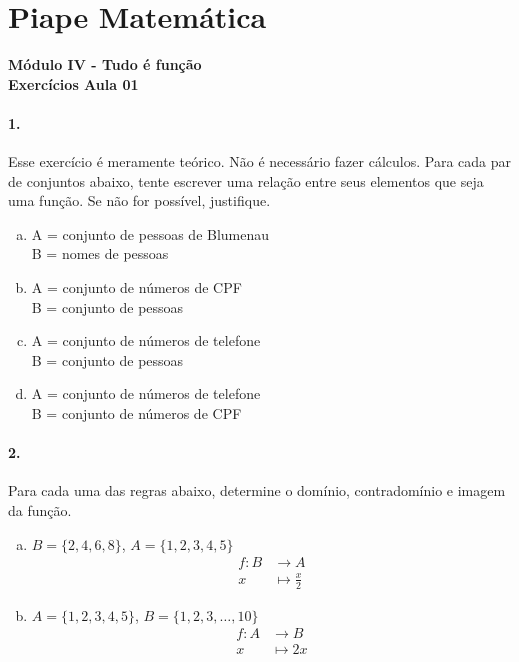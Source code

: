 \documentclass[a4paper,12pt]{article}
\begin{document}
 
  
\section*{Piape Matemática} 
\textbf{Módulo IV - Tudo é função}\\
\textbf{Exercícios Aula 01}         
\begin{multicols}{2}
\paragraph*{1.}  Esse exercício é meramente teórico. Não é necessário fazer cálculos. Para cada par de conjuntos abaixo, tente escrever uma relação entre seus elementos que seja uma função. Se não for possível, justifique.

\begin{enumerate}[a)]
    \item A = conjunto de pessoas de Blumenau\\B = nomes de pessoas
    \item A = conjunto de números de CPF\\B = conjunto de pessoas
    \item A = conjunto de números de telefone\\B = conjunto de pessoas
    \item A = conjunto de números de telefone\\B = conjunto de números de CPF
\end{enumerate}

\paragraph*{2.} Para cada uma das regras abaixo, determine o domínio, contradomínio e imagem da função.
\begin{enumerate}[a)]
    \item $B = \{2,4,6,8\}$, $A = \{1,2,3,4,5\}$
    $$\begin{aligned}
        f:B&\to A\\
        x&\mapsto \frac{x}{2}
    \end{aligned}$$

    \item $A = \{1,2,3,4,5\}$, $B = \{1,2,3,\ldots, 10\}$
    $$\begin{aligned}
        f:A&\to B\\
        x&\mapsto 2x
    \end{aligned}$$
    

\end{enumerate}
\end{multicols}
\end{document}
